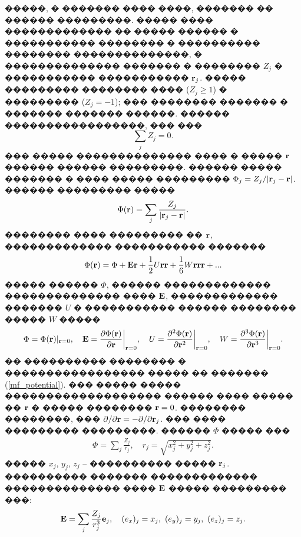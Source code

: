 \documentclass[12pt,titlepage]{article}
\begin{document}
�����, � ������� ���� ����, ������� �� ������ ���������. ����� ���� ������������� �� ����� ������ � ����������� �������� � ���������� �������� ��������������, � �������������� ������� � �������� $Z_{j} $ � ����������� ����������� ${\bf r}_{j} $. ����� ��������� �������� ���� ($Z_{j} \ge 1$) � ��������� ($Z_{j} =-1$); ��� �������� ������� � ������� ������� ������. ������ �����������������, ��� ���
\begin{equation}
    \label{neutrality}
    \sum_j Z_{j} = 0.
\end{equation}
��� ����� �������������� ���� � ����� ${\bf r}$ ������ ������ ���������. ������ ����� ������� � ���� ����� ��������� $\Phi _{j} = Z_{j} / |{\bf r}_{j} - {\bf r}| $. ������ ��������� �����
\begin{equation}
    \label{mf_potential}
    \Phi ({\bf r})=\sum_j \frac{Z_{j}}{ |{\bf r}_{j} -{\bf r}| }.
\end{equation}
�������� ���� ��������� �� ${\bf r}$, ������������� ����������� �������
\begin{equation}
    \label{decomposition}
    \Phi ({\bf r}) = \Phi+{\bf E}{\bf r}+\frac{1}{2} U {\bf r}{\bf r} + \frac{1}{6} W {\bf r} {\bf r} {\bf r} + ...
\end{equation}
����� ������ $\Phi$, ������ ������������� �������������� ���� $\bf{E}$, ������������� ������� $U$ � ����������� ������ �������� ����� $W$ �����
\begin{equation}
    \Phi = \Phi({\bf r})|_{{\bf r} = 0},\quad
    {\bf E} = \frac{\partial \Phi({\bf r})}{\partial {\bf r}}\bigg|_{ {\bf r} = 0 }, \quad
    U       = \frac{\partial^2 \Phi({\bf r})}{\partial {\bf r}^2}\bigg|_{ {\bf r} = 0 }, \quad
    W       = \frac{\partial^3 \Phi({\bf r})}{\partial {\bf r}^3}\bigg|_{ {\bf r} = 0 }.
\end{equation}
�� ���������� �������� � ����������������� ����� �� ������� (\ref{mf_potential}). ��� ����� ����� ������������������� ������ ���� ����� �� ${\bf r}$ � ����� �������� ${\bf r} = 0$. �������� ��������, ��� $\partial /\partial {\bf r} = - \partial / \partial {\bf r}_j$. ��� ���� ��������� ���������. ������ $\Phi$ ����� ���
\begin{gather}
    \label{momenta1}
    \Phi =\sum_j \frac{Z_{j}}{r_j}, \quad r_{j} =\sqrt{x_{j}^{2} +y_{j}^{2} +z_{j}^{2} }.
\end{gather}
����� $x_j$, $y_j$, $z_j$ -- ���������� ����� ${\bf r}_j$. ���������� ������� ������������� �������������� ���� $\bf E$ ����� ��������� ���:
\begin{gather}
    \label{momenta2}
    {\bf E} = \sum_j \frac{Z_j}{ r_{j}^{3} } {\bf e}_j, \quad (e_x)_j = x_j, ~ (e_y)_j = y_j, ~ (e_z)_j = z_j.
\end{gather}
\end{document}
